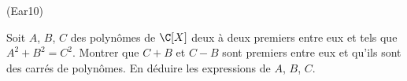 \begin{tiny}(Ear10)\end{tiny} Soit $A$, $B$, $C$ des polyn{\^o}mes de $\C[X]$ deux {\`a} deux premiers entre eux et tels que $A^{2}+B^{2}=C^{2}$. Montrer que $C+B$ et $C-B$ sont premiers entre eux et qu'ils sont des carr{\'e}s de polyn{\^o}mes$.$ En d{\'e}duire les expressions de $A$, $B$, $C$.